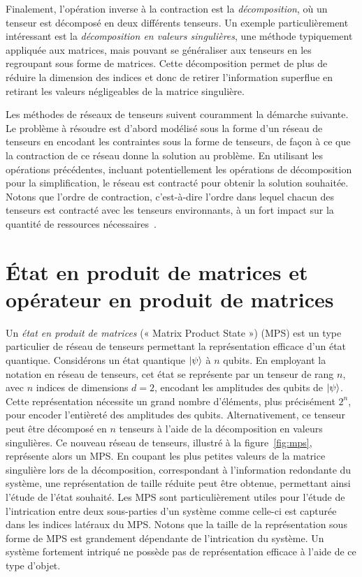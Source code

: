 Finalement, l'opération inverse à la contraction est la \textit{décomposition}, où un tenseur est décomposé en deux différents tenseurs. Un exemple particulièrement intéressant est la \textit{décomposition en valeurs singulières}, une méthode typiquement appliquée aux matrices, mais pouvant se généraliser aux tenseurs en les regroupant sous forme de matrices. Cette décomposition permet de plus de réduire la dimension des indices et donc de retirer l'information superflue en retirant les valeurs négligeables de la matrice singulière.

Les méthodes de réseaux de tenseurs suivent couramment la démarche suivante. Le problème à résoudre est d'abord modélisé sous la forme d'un réseau de tenseurs en encodant les contraintes sous la forme de tenseurs, de façon à ce que la contraction de ce réseau donne la solution au problème. En utilisant les opérations précédentes, incluant potentiellement les opérations de décomposition pour la simplification, le réseau est contracté pour obtenir la solution souhaitée. Notons que l'ordre de contraction, c'est-à-dire l'ordre dans lequel chacun des tenseurs est contracté avec les tenseurs environnants, à un fort impact sur la quantité de ressources nécessaires~\cite{grayHyperoptimizedTensorNetwork2021}.


\section{État en produit de matrices et opérateur en produit de matrices}
\label{sec:mps-mpo}

Un \textit{état en produit de matrices} (« Matrix Product State ») (MPS) est un type particulier de réseau de tenseurs permettant la représentation efficace d'un état quantique. Considérons un état quantique $\ket{\psi}$ à $n$ qubits. En employant la notation en réseau de tenseurs, cet état se représente par un tenseur de rang $n$, avec $n$ indices de dimensions $d=2$, encodant les amplitudes des qubits de $\ket{\psi}$. Cette représentation nécessite un grand nombre d'éléments, plus précisément $2^{n}$, pour encoder l'entièreté des amplitudes des qubits. Alternativement, ce tenseur peut être décomposé en $n$ tenseurs à l'aide de la décomposition en valeurs singulières. Ce nouveau réseau de tenseurs, illustré à la figure~\ref{fig:mps}, représente alors un MPS. En coupant les plus petites valeurs de la matrice singulière lors de la décomposition, correspondant à l'information redondante du système, une représentation de taille réduite peut être obtenue, permettant ainsi l'étude de l'état souhaité. Les MPS sont particulièrement utiles pour l'étude de l'intrication entre deux sous-parties d'un système comme celle-ci est capturée dans les indices latéraux du MPS. Notons que la taille de la représentation sous forme de MPS est grandement dépendante de l'intrication du système. Un système fortement intriqué ne possède pas de représentation efficace à l'aide de ce type d'objet.

